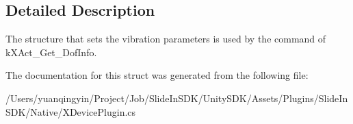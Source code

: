 \subsection{Detailed Description}
The structure that sets the vibration parameters is used by the command of k\+X\+Act\+\_\+\+Get\+\_\+Dof\+Info. 

The documentation for this struct was generated from the following file\+:\begin{DoxyCompactItemize}
\item 
/\+Users/yuanqingyin/\+Project/\+Job/\+Slide\+In\+S\+D\+K/\+Unity\+S\+D\+K/\+Assets/\+Plugins/\+Slide\+In\+S\+D\+K/\+Native/X\+Device\+Plugin.\+cs\end{DoxyCompactItemize}
